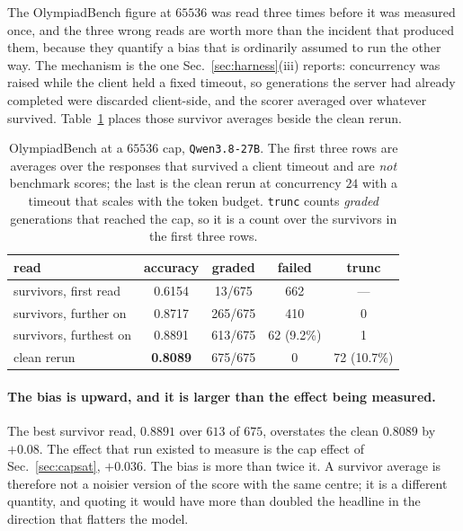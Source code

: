 The OlympiadBench figure at $65536$ was read three times before it was measured once, and the
three wrong reads are worth more than the incident that produced them, because they quantify
a bias that is ordinarily assumed to run the other way. The mechanism is the one
Sec.~\ref{sec:harness}(iii) reports: concurrency was raised while the client held a fixed
timeout, so generations the server had already completed were discarded client-side, and the
scorer averaged over whatever survived. Table~\ref{tab:survivor} places those survivor
averages beside the clean rerun.

\begin{table}[t]
\centering\small
\caption{OlympiadBench at a $65536$ cap, \texttt{Qwen3.8-27B}. The first three rows are
averages over the responses that survived a client timeout and are \emph{not} benchmark
scores; the last is the clean rerun at concurrency $24$ with a timeout that scales with the
token budget. \texttt{trunc} counts \emph{graded} generations that reached the cap, so it is
a count over the survivors in the first three rows.}
\label{tab:survivor}
\begin{tabular}{lcccc}
\toprule
read & accuracy & graded & failed & trunc \\
\midrule
survivors, first read     & 0.6154 & 13/675  & 662        & --- \\
survivors, further on     & 0.8717 & 265/675 & 410        & 0 \\
survivors, furthest on    & 0.8891 & 613/675 & 62 (9.2\%) & 1 \\
\midrule
clean rerun               & \textbf{0.8089} & 675/675 & 0 & 72 (10.7\%) \\
\bottomrule
\end{tabular}
\end{table}

\paragraph{The bias is upward, and it is larger than the effect being measured.} The best
survivor read, $0.8891$ over $613$ of $675$, overstates the clean $0.8089$ by $+0.08$. The
effect that run existed to measure is the cap effect of Sec.~\ref{sec:capsat}, $+0.036$. The
bias is more than twice it. A survivor average is therefore not a noisier version of the
score with the same centre; it is a different quantity, and quoting it would have more than
doubled the headline in the direction that flatters the model.

